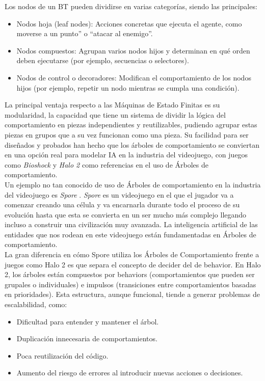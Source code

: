 Los nodos de un BT pueden dividirse en varias categorías, siendo las principales:

\begin{itemize}
\item Nodos hoja (leaf nodes): Acciones concretas que ejecuta el agente, como moverse a un punto'' o ``atacar al enemigo''.
\item Nodos compuestos: Agrupan varios nodos hijos y determinan en qué orden deben ejecutarse (por ejemplo, secuencias o selectores).
\item Nodos de control o decoradores: Modifican el comportamiento de los nodos hijos (por ejemplo, repetir un nodo mientras se cumpla una condición).
\end{itemize}

La principal ventaja respecto a las Máquinas de Estado Finitas es su modularidad, la capacidad que tiene un sistema de dividir la lógica del comportamiento en piezas independientes y reutilizables, pudiendo agrupar estas piezas en grupos que a su vez funcionan como una pieza. Su facilidad para ser diseñados y probados han hecho que los árboles de comportamiento se conviertan en una opción real para modelar IA en la industria del videojuego, con juegos como \textit{Bioshock} \citep{bioshock} y \textit{Halo 2} \citep{halo2} como referencias en el uso de Árboles de comportamiento.\\

Un ejemplo no tan conocido de uso de Árboles de comportamiento en la industria del videojuego es \textit{Spore} \citep{spore}. \textit{Spore} es un videojuego en el que el jugador va a comenzar creando una célula y va encarnarla durante todo el proceso de su evolución hasta que esta se convierta en un ser mucho más complejo llegando incluso a construir una civilización muy avanzada. La inteligencia artificial de las entidades que nos rodean en este videojuego están fundamentadas en Árboles de comportamiento.\\

La gran diferencia en cómo Spore utiliza los Árboles de Comportamiento frente a juegos como Halo 2 es que separa el concepto de decider del de behavior. En Halo 2, los árboles están compuestos por behaviors (comportamientos que pueden ser grupales o individuales) e impulsos (transiciones entre comportamientos basadas en prioridades). Esta estructura, aunque funcional, tiende a generar problemas de escalabilidad, como:
\begin{itemize}
	\item Dificultad para entender y mantener el árbol.
	\item Duplicación innecesaria de comportamientos.
	\item Poca reutilización del código.
	\item Aumento del riesgo de errores al introducir nuevas acciones o decisiones.
\end{itemize}

